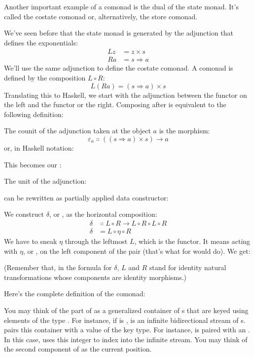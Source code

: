 Another important example of a comonad is the dual of the state monad.
It's called the costate comonad or, alternatively, the store comonad.

We've seen before that the state monad is generated by the adjunction
that defines the exponentials:
\[
	\begin{aligned}
		L z & = z\times{}s      \\
		R a & = s \Rightarrow a
	\end{aligned}
\]
We'll use the same adjunction to define the costate comonad. A comonad
is defined by the composition $L \circ R$:
\[L (R a) = (s \Rightarrow a)\times{}s\]
Translating this to Haskell, we start with the adjunction between the
 functor on the left and the  functor or the
right. Composing  after  is equivalent to
the following definition:

The counit of the adjunction taken at the object $a$ is the
morphism:
\[\varepsilon_a \Colon ((s \Rightarrow a)\times{}s) \to a\]
or, in Haskell notation:

This becomes our :

The unit of the adjunction:

can be rewritten as partially applied data constructor:

We construct $\delta$, or , as the horizontal composition:
\[
	\begin{aligned}
		\delta & \Colon L \circ R \to L \circ R \circ L \circ R \\
		\delta & = L \circ \eta \circ R
	\end{aligned}
\]
We have to sneak $\eta$ through the leftmost $L$, which is the
 functor. It means acting with $\eta$, or , on
the left component of the pair (that's what  for
 would do). We get:

(Remember that, in the formula for $\delta$, $L$ and $R$ stand
for identity natural transformations whose components are identity
morphisms.)

Here's the complete definition of the  comonad:

You may think of the  part of  as a
generalized container of s that are keyed using elements of
the type . For instance, if  is ,
 is an infinite bidirectional stream of
s.  pairs this container with a value of the key
type. For instance,  is paired with an
. In this case,  uses this integer to index
into the infinite stream. You may think of the second component of
 as the current position.

